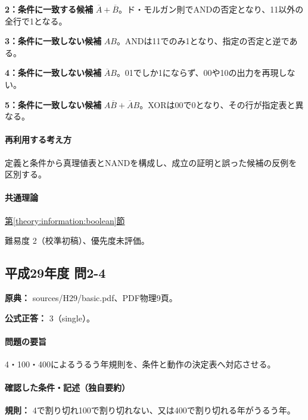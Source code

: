 \noindent\textbf{2：条件に一致する候補} \(\overline A+\overline B\)。ド・モルガン則でANDの否定となり、11以外の全行で1となる。\par

\noindent\textbf{3：条件に一致しない候補} \(AB\)。ANDは11でのみ1となり、指定の否定と逆である。\par

\noindent\textbf{4：条件に一致しない候補} \(\overline A B\)。01でしか1にならず、00や10の出力を再現しない。\par

\noindent\textbf{5：条件に一致しない候補} \(A\overline B+\overline A B\)。XORは00で0となり、その行が指定表と異なる。\par

\paragraph{再利用する考え方} 定義と条件から真理値表とNANDを構成し、成立の証明と誤った候補の反例を区別する。

\paragraph{共通理論} \hyperref[theory:information:boolean]{第\ref*{theory:information:boolean}節}

\par 難易度 2（校準初稿）、優先度未評価。

\subsection{平成29年度 問2-4}
\label{q:h29-reg-basic-2-4}

\noindent\textbf{原典：} sources/H29/basic.pdf、PDF物理9頁。

\textbf{公式正答：} 3（single）。

\paragraph{問題の要旨} 4・100・400によるうるう年規則を、条件と動作の決定表へ対応させる。

\paragraph{確認した条件・記述（独自要約）}\mbox{}\par

\noindent\textbf{規則：} 4で割り切れ100で割り切れない、又は400で割り切れる年がうるう年。\par


